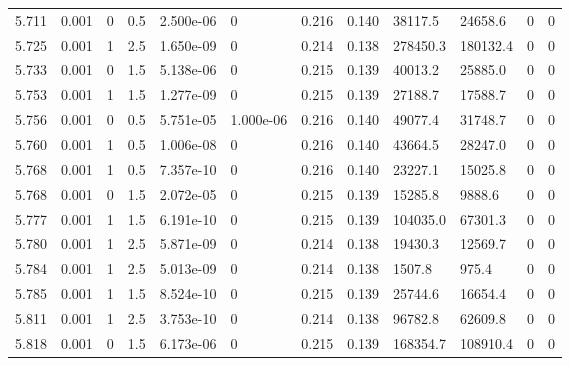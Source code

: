 \documentclass[preview]{standalone}
\begin{document}
{{{{{{{{{\begin{tabular}{L{1.2cm}C{1.2cm} C{0.3cm}C{0.5cm} C{1.4cm}C{1.4cm} C{1.4cm}C{1.4cm} C{1.6cm}C{1.6cm} C{1.6cm}C{1.6cm}}
  5.711  &  0.001  & 0     & 0.5 &  2.500e-06  & 0  &  0.216&   0.140& 38117.5 & 24658.6   &  0 & 0  \\ 
  5.725  &  0.001  & 1     & 2.5 &  1.650e-09  & 0  &  0.214&   0.138& 278450.3 & 180132.4   &  0 & 0  \\ 
  5.733  &  0.001  & 0     & 1.5 &  5.138e-06  & 0  &  0.215&   0.139& 40013.2 & 25885.0   &  0 & 0  \\ 
  5.753  &  0.001  & 1     & 1.5 &  1.277e-09  & 0  &  0.215&   0.139& 27188.7 & 17588.7   &  0 & 0  \\ 
  5.756  &  0.001  & 0     & 0.5 &  5.751e-05  & 1.000e-06  &  0.216&   0.140& 49077.4 & 31748.7   &  0 & 0  \\ 
  5.760  &  0.001  & 1     & 0.5 &  1.006e-08  & 0  &  0.216&   0.140& 43664.5 & 28247.0   &  0 & 0  \\ 
  5.768  &  0.001  & 1     & 0.5 &  7.357e-10  & 0  &  0.216&   0.140& 23227.1 & 15025.8   &  0 & 0  \\ 
  5.768  &  0.001  & 0     & 1.5 &  2.072e-05  & 0  &  0.215&   0.139& 15285.8 & 9888.6   &  0 & 0  \\ 
  5.777  &  0.001  & 1     & 1.5 &  6.191e-10  & 0  &  0.215&   0.139& 104035.0 & 67301.3   &  0 & 0  \\ 
  5.780  &  0.001  & 1     & 2.5 &  5.871e-09  & 0  &  0.214&   0.138& 19430.3 & 12569.7   &  0 & 0  \\ 
  5.784  &  0.001  & 1     & 2.5 &  5.013e-09  & 0  &  0.214&   0.138& 1507.8 & 975.4   &  0 & 0  \\ 
  5.785  &  0.001  & 1     & 1.5 &  8.524e-10  & 0  &  0.215&   0.139& 25744.6 & 16654.4   &  0 & 0  \\ 
  5.811  &  0.001  & 1     & 2.5 &  3.753e-10  & 0  &  0.214&   0.138& 96782.8 & 62609.8   &  0 & 0  \\ 
  5.818  &  0.001  & 0     & 1.5 &  6.173e-06  & 0  &  0.215&   0.139& 168354.7 & 108910.4   &  0 & 0  \\ 
\hline 
\end{tabular} 

}}}}}}}}}
\end{document}
